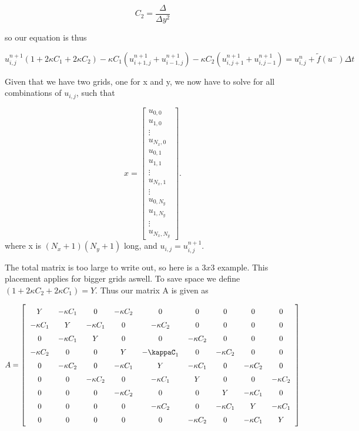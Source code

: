 \documentclass[norsk,a4paper,12pt]{scrartcl}
\begin{document}
\begin{equation*}
    C_2 = \frac{\Delta}{\Delta y^2}
\end{equation*}

so our equation is thus 

\begin{equation}
    u_{i,j}^{n+1}(1+2\kappa C_1 + 2\kappa C_2) - \kappa C_1(u_{i+1, j}^{n+1} + u_{i-1, j}^{n+1}) - \kappa C_2(u_{i, j+1}^{n+1} + u_{i, j-1}^{n+1})= u_{i,j}^n   + \tilde{f}(u^-)\Delta t
\end{equation}

Given that we have two grids, one for x and y, we now have to solve for all combinations of $u_{i,j}$, such that

\begin{equation*}
        x = \begin{bmatrix}
    
    u_{0, 0}\\
    u_{1, 0}\\
    \vdots\\
    u_{N_x, 0}
    \\
    
    u_{0, 1}\\
    u_{1, 1}\\
    \vdots\\
    u_{N_x, 1}\\
    \vdots \\
    u_{0, N_y}\\
    u_{1, N_y}\\
    \vdots\\
    u_{N_x, N_y}
    \end{bmatrix}.
\end{equation*}
where x is $(N_x+1)(N_y+1)$ long, and $u_{i,j} = u_{i,j}^{n+1}$. 

The total matrix is too large to write out, so here is a $3x3$ example. This placement applies for bigger grids aswell. To save space we define $(1 + 2\kappa C_2 + 2\kappa C_1) = Y$. Thus our matrix A is given as 

\begin{align*}
  \renewcommand{\arraystretch}{1.5}
  \setlength{\arraycolsep}{6pt}
  A=\left[\begin{array}{ccccccccc}
Y & -\kappa C_1 & 0 & -\kappa C_2 & 0 & 0 & 0 & 0 & 0 \\
-\kappa C_1 & Y & -\kappa C_1 & 0 & -\kappa C_2 & 0 & 0 & 0 & 0 \\
0 & -\kappa C_1 & Y & 0 & 0 & -\kappa C_2 & 0 & 0 & 0 \\
-\kappa C_2 & 0 & 0 & Y & -\kappaC_1 & 0 & -\kappa C_2 & 0 & 0 \\
0 & -\kappa C_2 & 0 & -\kappa C_1 & Y & -\kappa C_1 & 0 & -\kappa C_2 & 0 \\
0 & 0 &-\kappa C_2 & 0 & -\kappa C_1 & Y & 0 & 0 & -\kappa C_2 \\
0 & 0 & 0 & -\kappa C_2 & 0 & 0 & Y & -\kappa C_1 & 0 \\
0 & 0 & 0 & 0 & -\kappa C_2 & 0 & -\kappa C_1 & Y & -\kappa C_1 \\
0 & 0 & 0 & 0 & 0 & -\kappa C_2 & 0 & -\kappa C_1 & Y
\end{array}\right]
\end{align*}
\end{document}
